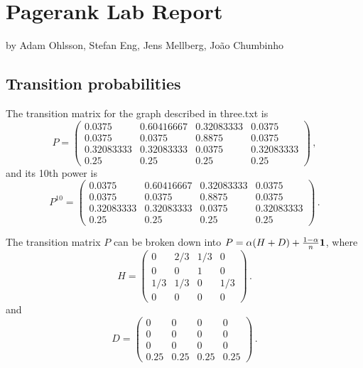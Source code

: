 \documentclass{tufte-handout}
\begin{document}
\newpage
\section{Pagerank Lab Report}
by Adam Ohlsson, Stefan Eng, Jens Mellberg, João Chumbinho


\subsection{Transition probabilities}

The transition matrix for the graph described in three.txt
is
\begin{equation*}
P = 
\left(
\begin{array}{cccc}
0.0375    &  0.60416667&  0.32083333&  0.0375   \\
0.0375    &  0.0375    &  0.8875    &  0.0375    \\
0.32083333&  0.32083333&  0.0375    &  0.32083333\\
0.25      &  0.25      &  0.25      &  0.25      
\end{array}
\right)\,,
\end{equation*}
and its 10th power is
\begin{equation*}
P^{10} = 
\left(
\begin{array}{cccc}
0.0375    &  0.60416667&  0.32083333&  0.0375   \\
0.0375    &  0.0375    &  0.8875    &  0.0375    \\
0.32083333&  0.32083333&  0.0375    &  0.32083333\\
0.25      &  0.25      &  0.25      &  0.25      
\end{array}
\right)\,.
\end{equation*}

The transition matrix $P$ can be broken down into  $P = \alpha(H + D)
+ \frac{1-\alpha}{n} \bf 1$, where
\begin{equation*}
H = 
\left(
\begin{array}{cccc}
0    &  2/3 & 1/3 &  0\\
0    &  0    &  1    &  0\\
1/3 & 1/3 &  0    &  1/3\\
0      &  0 &  0      &  0      
\end{array}
\right)\,.
\end{equation*}
and
\begin{equation*}
D = 
\left(
\begin{array}{cccc}
0 & 0 & 0 & 0\\
0 & 0 & 0 & 0\\
0 & 0 & 0 & 0\\
0.25 & 0.25 & 0.25 & 0.25
\end{array}
\right)\,.
\end{equation*}
\end{document}
